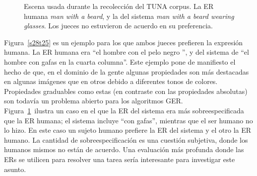 \begin{figure}[h]
\begin{minipage}{0.48\linewidth}
\vspace*{-.3cm}
\caption{Escena usada durante la recolecci\'on del TUNA corpus. La ER humana \emph{man with a beard},  y la del sistema \emph{man with a beard wearing glasses}. Los jueces no estuvieron de acuerdo en su preferencia.}
\label{s307t21}
\end{minipage}
\end{figure}




Figura~\ref{s28t25} es un ejemplo para los que ambos jueces prefieren la expresi\'on humana. La ER humana era ``el hombre con el pelo negro '', y del sistema de ``el hombre con gafas en la cuarta columna''. Este ejemplo pone de manifiesto el hecho de que, en el dominio de la gente algunas propiedades son m\'as destacadas en algunas im\'agenes que en otros debido a diferentes tonos de colores. Propiedades graduables como estas (en contraste con las propiedades absolutas) son todav\'{i}a un problema abierto para los algoritmos GER.\\

Figura~\ref{s307t21}~ilustra un caso en el que la ER del sistema era m\'as sobreespecificada que la ER humana; el sistema incluye ``con gafas'', mientras que el ser humano no lo hizo. En este caso un sujeto humano prefiere la ER del sistema y el otro la ER humano. La cantidad de sobreespecificaci\'on es una cuesti\'on subjetiva, donde los humanos mismos no est\'an de acuerdo. Una evaluaci\'on m\'as profunda donde las ERs se utilicen para resolver una tarea ser\'{i}a interesante para investigar este asunto.

